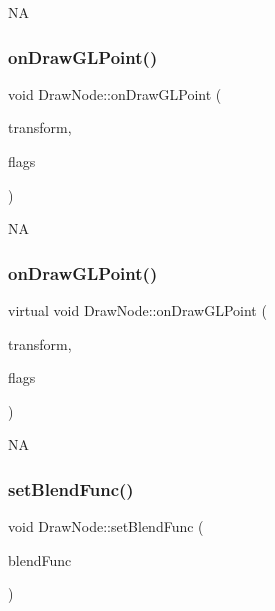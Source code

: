 NA \mbox{\label{classDrawNode_afd5151bb132169da091320b4a354945b}} 
\subsubsection{\texorpdfstring{on\+Draw\+G\+L\+Point()}{onDrawGLPoint()}\hspace{0.1cm}{\footnotesize\ttfamily [1/2]}}
{\footnotesize\ttfamily void Draw\+Node\+::on\+Draw\+G\+L\+Point (\begin{DoxyParamCaption}\item[{const \hyperlink{classMat4}{Mat4} \&}]{transform,  }\item[{uint32\+\_\+t}]{flags }\end{DoxyParamCaption})\hspace{0.3cm}{\ttfamily [virtual]}}

NA \mbox{\label{classDrawNode_a57cdee495c8c817e6bc0dafd3228b998}} 
\subsubsection{\texorpdfstring{on\+Draw\+G\+L\+Point()}{onDrawGLPoint()}\hspace{0.1cm}{\footnotesize\ttfamily [2/2]}}
{\footnotesize\ttfamily virtual void Draw\+Node\+::on\+Draw\+G\+L\+Point (\begin{DoxyParamCaption}\item[{const \hyperlink{classMat4}{Mat4} \&}]{transform,  }\item[{uint32\+\_\+t}]{flags }\end{DoxyParamCaption})\hspace{0.3cm}{\ttfamily [virtual]}}

NA \mbox{\label{classDrawNode_aa2fec0829a3f19c5996946fc25eccd66}} 
\subsubsection{\texorpdfstring{set\+Blend\+Func()}{setBlendFunc()}\hspace{0.1cm}{\footnotesize\ttfamily [1/2]}}
{\footnotesize\ttfamily void Draw\+Node\+::set\+Blend\+Func (\begin{DoxyParamCaption}\item[{const \hyperlink{structBlendFunc}{Blend\+Func} \&}]{blend\+Func }\end{DoxyParamCaption})}

